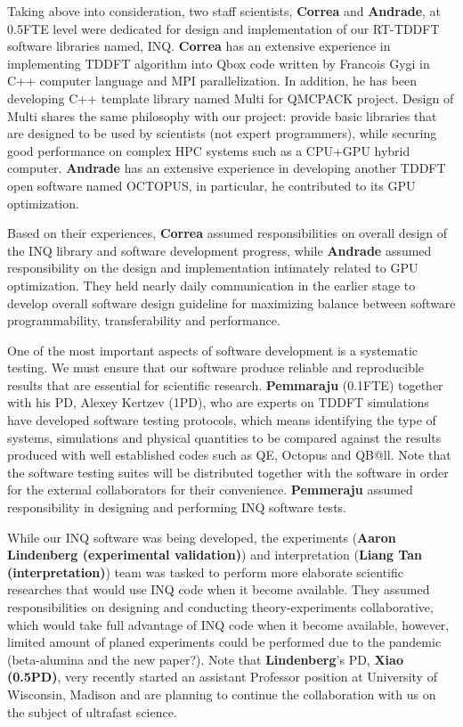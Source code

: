 Taking above into consideration, two staff scientists, {\bf Correa} and {\bf Andrade}, at 0.5FTE level were dedicated for design and implementation of our RT-TDDFT software libraries named, INQ. {\bf Correa} has an extensive experience in implementing TDDFT algorithm into Qbox code written by Francois Gygi in C++ computer language and MPI parallelization. In addition, he has been developing C++ template library named Multi for QMCPACK project. Design of Multi shares the same philosophy with our project: provide basic libraries that are designed to be used by scientists (not expert programmers), while securing good performance on complex HPC systems such as a CPU+GPU hybrid computer. {\bf Andrade} has an extensive experience in developing another TDDFT open software named OCTOPUS, in particular, he contributed to its GPU optimization.  

Based on their experiences, {\bf Correa} assumed responsibilities on overall design of the INQ library and software development progress, while {\bf Andrade} assumed responsibility on the design and implementation intimately related to GPU optimization. They held nearly daily communication in the earlier stage to develop overall software design guideline for maximizing balance between software programmability, transferability and performance. 

One of the most important aspects of software development is a systematic testing. We must ensure that our software produce reliable and reproducible results that are essential for scientific research. {\bf Pemmaraju} (0.1FTE) together with his PD, Alexey Kertzev (1PD), who are experts on TDDFT simulations have developed software testing protocols, which means identifying the type of systems, simulations and physical quantities to be compared against the results produced with well established codes such as QE, Octopus and QB@ll. Note that the software testing suites will be distributed together with the software in order for the external collaborators for their convenience. {\bf Pemmeraju} assumed responsibility in designing and performing INQ software tests.


While our INQ software was being developed, the experiments ({\bf Aaron Lindenberg (experimental validation)}) and interpretation ({\bf Liang Tan (interpretation)}) team was tasked to perform more elaborate scientific researches that would use INQ code when it become available. They assumed responsibilities on designing and conducting theory-experiments collaborative, which would take full advantage of INQ code when it become available, however, limited amount of planed experiments could be performed due to the pandemic (beta-alumina and the new paper?). Note that {\bf Lindenberg}'s PD, {\bf Xiao (0.5PD)}, very recently started an assistant Professor position at University of Wisconsin, Madison and are planning to continue the collaboration with us on the subject of ultrafast science.

